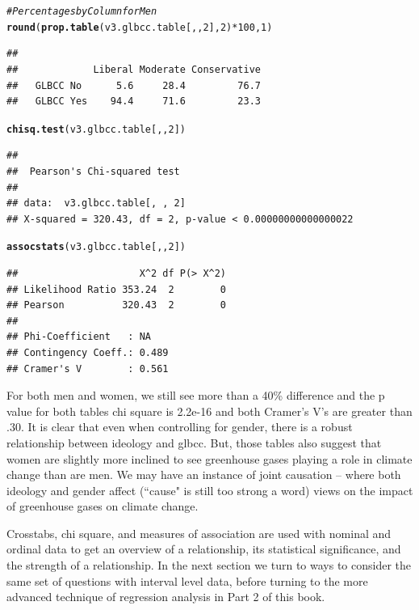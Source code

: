 \documentclass[11pt,openany]{book}\usepackage[]{graphicx}\usepackage[]{color}
\makeatletter
\newcommand{\hlnum}[1]{\textcolor[rgb]{0.686,0.059,0.569}{#1}}%
\newcommand{\hlcom}[1]{\textcolor[rgb]{0.678,0.584,0.686}{\textit{#1}}}%
\newcommand{\hlopt}[1]{\textcolor[rgb]{0,0,0}{#1}}%
\newcommand{\hlstd}[1]{\textcolor[rgb]{0.345,0.345,0.345}{#1}}%
\newcommand{\hlkwd}[1]{\textcolor[rgb]{0.737,0.353,0.396}{\textbf{#1}}}%
\newenvironment{kframe}{%
 \def\at@end@of@kframe{}%
 \ifinner\ifhmode%
  \def\at@end@of@kframe{\end{minipage}}%
  \begin{minipage}{\columnwidth}%
 \fi\fi%
 \def\FrameCommand##1{\hskip\@totalleftmargin \hskip-\fboxsep
 \colorbox{shadecolor}{##1}\hskip-\fboxsep
     \hskip-\linewidth \hskip-\@totalleftmargin \hskip\columnwidth}%
 \MakeFramed {\advance\hsize-\width
   \@totalleftmargin\z@ \linewidth\hsize
   \@setminipage}}%
 {\par\unskip\endMakeFramed%
 \at@end@of@kframe}
\newenvironment{knitrout}{}{} %
\renewenvironment{knitrout}{\begin{singlespace}}{\end{singlespace}} %
\makeatother
\begin{document}
\begin{knitrout}
\color{fgcolor}\begin{kframe}
\begin{alltt}
\hlcom{# Percentages by Column for Men}
\hlkwd{round}\hlstd{(}\hlkwd{prop.table}\hlstd{(v3.glbcc.table[, ,} \hlnum{2}\hlstd{],} \hlnum{2}\hlstd{)} \hlopt{*} \hlnum{100}\hlstd{,} \hlnum{1}\hlstd{)}
\end{alltt}
\begin{verbatim}
##            
##             Liberal Moderate Conservative
##   GLBCC No      5.6     28.4         76.7
##   GLBCC Yes    94.4     71.6         23.3
\end{verbatim}
\begin{alltt}
\hlkwd{chisq.test}\hlstd{(v3.glbcc.table[, ,} \hlnum{2}\hlstd{])}
\end{alltt}
\begin{verbatim}
## 
## 	Pearson's Chi-squared test
## 
## data:  v3.glbcc.table[, , 2]
## X-squared = 320.43, df = 2, p-value < 0.00000000000000022
\end{verbatim}
\begin{alltt}
\hlkwd{assocstats}\hlstd{(v3.glbcc.table[, ,} \hlnum{2}\hlstd{])}
\end{alltt}
\begin{verbatim}
##                     X^2 df P(> X^2)
## Likelihood Ratio 353.24  2        0
## Pearson          320.43  2        0
## 
## Phi-Coefficient   : NA 
## Contingency Coeff.: 0.489 
## Cramer's V        : 0.561
\end{verbatim}
\end{kframe}
\end{knitrout}

For both men and women, we still see more than a 40\% difference and the p value for both tables chi square is 2.2e-16 and both Cramer's V's are greater than .30.  It is clear that even when controlling for gender, there is a robust relationship between ideology and glbcc.  But, those tables also suggest that women are slightly more inclined to see greenhouse gases playing a role in climate change than are men.   We may have an instance of joint causation -- where both ideology and gender affect (``cause" is still too strong a word) views on the impact of greenhouse gases on climate change.

Crosstabs, chi square, and measures of association are used with nominal and ordinal data to get an overview of a relationship, its statistical significance, and the strength of a relationship.  In the next section we turn to ways to consider the same set of questions with interval level data, before turning to the more advanced technique of regression analysis in Part 2 of this book.  
\end{document}
